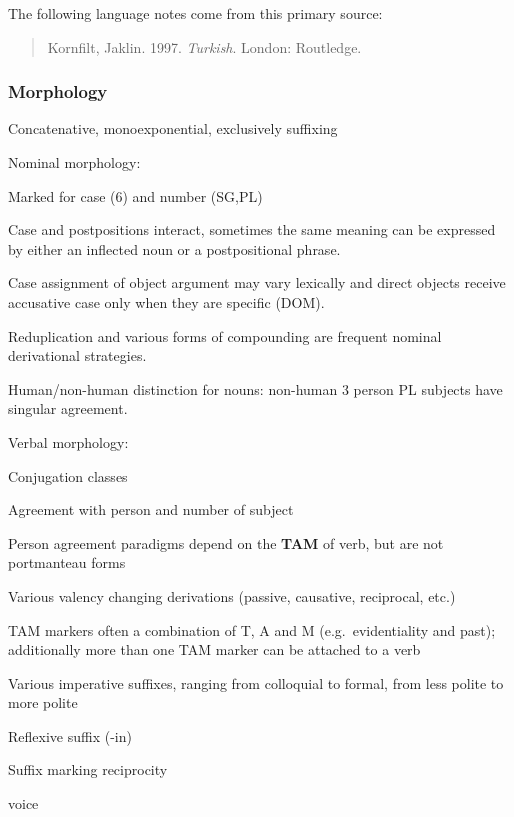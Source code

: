 \documentclass[a4paper, 11pt]{book}
\begin{document}
The following language notes come from this primary source: \citep{jaklin1997turkish}

\begin{quote}
Kornfilt, Jaklin. 1997. \textit{Turkish}. London: Routledge.
\end{quote}

\subsubsection*{Morphology}

\begin{itemize*}
\item Concatenative, monoexponential, exclusively suffixing
\item Nominal morphology:
\begin{itemize*}
	\item Marked for case (6) and number (SG,PL)
	\item Case and postpositions interact, sometimes the same meaning can be expressed by either an inflected noun or a postpositional phrase.
	\item Case assignment of object argument may vary lexically and direct objects receive accusative case only when they are specific (DOM).
	\item Reduplication and various forms of compounding are frequent nominal derivational strategies.
	\item Human/non-human distinction for nouns: non-human 3 person PL subjects have singular 	agreement.
\end{itemize*}
\item Verbal morphology:
\begin{itemize*}
	\item Conjugation classes
	\item Agreement with person and number of subject
	\item Person agreement paradigms depend on the \textbf{TAM} of verb, but are not portmanteau forms
	\item Various valency changing derivations (passive, causative, reciprocal, etc.)
	\item TAM markers often a combination of T, A and M (e.g.\ evidentiality and past); additionally 	more than one TAM marker can be attached to a verb
	\item Various imperative suffixes, ranging from colloquial to formal, from less polite to more polite
	\item Reflexive suffix (-in) 
	\item Suffix marking reciprocity 
	\item voice
\end{itemize*}



\end{itemize*}
\end{document}

